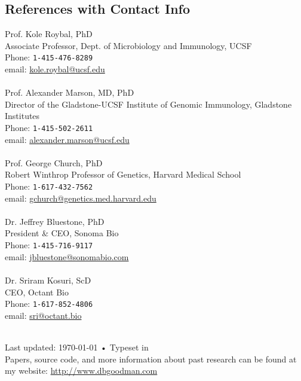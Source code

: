 \documentclass[11pt, letterpaper]{article}
\newcommand{\years}[1]{\marginnote{\scriptsize #1}}
\begin{document}
\begin{samepage}
\section*{References with Contact Info}
\noindent

\noindent\years{ }Prof. Kole Roybal, PhD\\ 
{\footnotesize Associate Professor, Dept. of Microbiology and Immunology, UCSF\\
    Phone: \texttt{1-415-476-8289}\\
    email: \href{mailto:kole.roybal@ucsf.edu}{kole.roybal@ucsf.edu}\\
}\\

\noindent\years{ }Prof. Alexander Marson, MD, PhD\\ 
{\footnotesize Director of the Gladstone-UCSF Institute of Genomic Immunology, Gladstone Institutes\\
    Phone: \texttt{1-415-502-2611}\\
    email: \href{mailto:alexander.marson@ucsf.edu}{alexander.marson@ucsf.edu}\\
}\\

\noindent\years{ }Prof. George Church, PhD\\ 
{\footnotesize Robert Winthrop Professor of Genetics, Harvard Medical School\\
    Phone: \texttt{1-617-432-7562}\\
    email: \href{mailto:gchurch@genetics.med.harvard.edu}{gchurch@genetics.med.harvard.edu}\\
}\\

\noindent\years{ }Dr. Jeffrey Bluestone, PhD\\ 
{\footnotesize President \& CEO, Sonoma Bio\\
    Phone: \texttt{1-415-716-9117}\\
    email: \href{mailto:jbluestone@sonomabio.com}{jbluestone@sonomabio.com}\\
}\\

\noindent\years{ }Dr. Sriram Kosuri, ScD\\ 
{\footnotesize CEO, Octant Bio\\
    Phone: \texttt{1-617-852-4806}\\
    email: \href{mailto:sri@octant.bio}{sri@octant.bio}\\
}\\

\end{samepage}

\begin{center}
{\scriptsize  Last updated: \today\- •\- Typeset in \href{http://nitens.org/taraborelli/cvtex}{
\XeTeX }\\
Papers, source code, and more information about past
research can be found at my website:
\href{http://www.dbgoodman.com}{http://www.dbgoodman.com}}
\end{center}

% 
\end{document}
